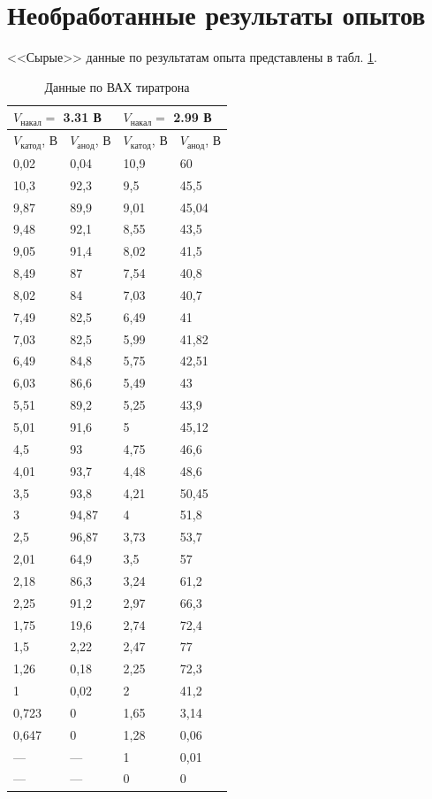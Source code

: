 \documentclass[a4paper]{article}
\begin{document}
\appendix
\section{Необработанные результаты опытов}

<<Сырые>> данные по результатам опыта представлены в табл. \ref{tab:ВАХ}.

\begin{table}[]
	\centering
	\begin{tabular}{|l|l|l|l|}
		\hline
		\multicolumn{2}{|l|}{$V_{накал}  = $ 3.31 В} & \multicolumn{2}{l|}{$V_{накал}  = $ 2.99 В} \\ \hline
		$V_{катод}$, В        & $V_{анод}$, В        & $V_{катод}$, В        & $V_{анод}$, В       \\ \hline
		0,02  & 0,04  & 10,9 & 60    \\ \hline
		10,3  & 92,3  & 9,5  & 45,5  \\ \hline
		9,87  & 89,9  & 9,01 & 45,04 \\ \hline
		9,48  & 92,1  & 8,55 & 43,5  \\ \hline
		9,05  & 91,4  & 8,02 & 41,5  \\ \hline
		8,49  & 87    & 7,54 & 40,8  \\ \hline
		8,02  & 84    & 7,03 & 40,7  \\ \hline
		7,49  & 82,5  & 6,49 & 41    \\ \hline
		7,03  & 82,5  & 5,99 & 41,82 \\ \hline
		6,49  & 84,8  & 5,75 & 42,51 \\ \hline
		6,03  & 86,6  & 5,49 & 43    \\ \hline
		5,51  & 89,2  & 5,25 & 43,9  \\ \hline
		5,01  & 91,6  & 5    & 45,12 \\ \hline
		4,5   & 93    & 4,75 & 46,6  \\ \hline
		4,01  & 93,7  & 4,48 & 48,6  \\ \hline
		3,5   & 93,8  & 4,21 & 50,45 \\ \hline
		3     & 94,87 & 4    & 51,8  \\ \hline
		2,5   & 96,87 & 3,73 & 53,7  \\ \hline
		2,01  & 64,9  & 3,5  & 57    \\ \hline
		2,18  & 86,3  & 3,24 & 61,2  \\ \hline
		2,25  & 91,2  & 2,97 & 66,3  \\ \hline
		1,75  & 19,6  & 2,74 & 72,4  \\ \hline
		1,5   & 2,22  & 2,47 & 77    \\ \hline
		1,26  & 0,18  & 2,25 & 72,3  \\ \hline
		1     & 0,02  & 2    & 41,2  \\ \hline
		0,723 & 0     & 1,65 & 3,14  \\ \hline
		0,647 & 0     & 1,28 & 0,06  \\ \hline
		---   & ---   & 1    & 0,01  \\ \hline
		---   & ---   & 0    & 0     \\ \hline
	\end{tabular}
	\caption{Данные по ВАХ тиратрона}
	\label{tab:ВАХ}
\end{table}
\end{document}
